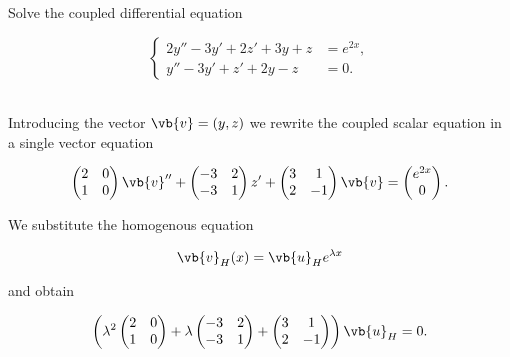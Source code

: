 \documentclass[english,a4paper,12pt]{report}
\begin{document}
{Solve the coupled differential equation

\begin{equation}
    \begin{cases}
        2y''-3y'+2z'+3y+z &= e^{2x}, \\
        y''-3y'+z'+2y-z &= 0.
    \end{cases}  
\end{equation}
~
}
{Introducing the vector \(\vb{v} = (y,z)\) we rewrite the coupled scalar equation in a single vector equation

\begin{equation}
    \begin{pmatrix}
        2 &  0 \\
        1 &  0 \\
    \end{pmatrix} \vb{v} '' + \begin{pmatrix}
        -3 &  2 \\
        -3 &  1 \\
    \end{pmatrix}z' + \begin{pmatrix}
        3 &  1 \\
        2 &  -1 \\
    \end{pmatrix}\vb{v} = \begin{pmatrix}
         e^{2x}  \\
         0 \\
    \end{pmatrix}.
\end{equation}

We substitute the homogenous equation

\begin{equation}
    \vb{v} _{H}(x) = \vb{u}_{H} e^{\lambda x}  
\end{equation}

and obtain 

\begin{equation}
    \left( \lambda ^2 \begin{pmatrix}
        2 &  0 \\
        1 &  0 \\
    \end{pmatrix}+ \lambda \begin{pmatrix}
        -3 &  2 \\
        -3 &  1 \\
    \end{pmatrix} + \begin{pmatrix}
        3 &  1 \\
        2 &  -1 \\
    \end{pmatrix} \right) \vb{u}_{H}  = 0.
\end{equation}

}
\end{document}
